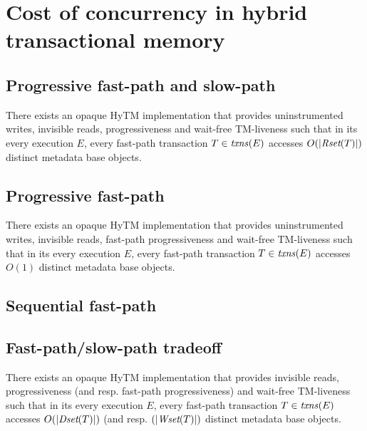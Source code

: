 \section{Cost of concurrency in hybrid transactional memory}
%
\subsection{Progressive fast-path and slow-path}
%

%
\begin{theorem}
\label{th:inswrite}
There exists an opaque HyTM implementation that provides uninstrumented writes, invisible reads, progressiveness
and wait-free TM-liveness such that
in its every execution $E$, every fast-path transaction $T\in \ms{txns}(E)$
accesses $O(|\textit{Rset}(T)|)$ distinct metadata base objects.
\end{theorem}
%
\subsection{Progressive fast-path}
%
\begin{theorem}
\label{th:inswrite2}
There exists an opaque HyTM implementation that provides uninstrumented writes, invisible reads, fast-path progressiveness
and wait-free TM-liveness such that
in its every execution $E$, every fast-path transaction $T\in \ms{txns}(E)$
accesses $O(1)$ distinct metadata base objects.
\end{theorem}


%
\subsection{Sequential fast-path}
%

%
\subsection{Fast-path/slow-path tradeoff}
%
\begin{theorem}
\label{th:write}
There exists an opaque HyTM implementation that provides invisible reads, progressiveness (and resp. fast-path progressiveness)
and wait-free TM-liveness such that
in its every execution $E$, every fast-path transaction $T\in \ms{txns}(E)$
accesses $O(|\textit{Dset}(T)|)$ (and resp. $(|\textit{Wset}(T)|)$ distinct metadata base objects.
\end{theorem}
